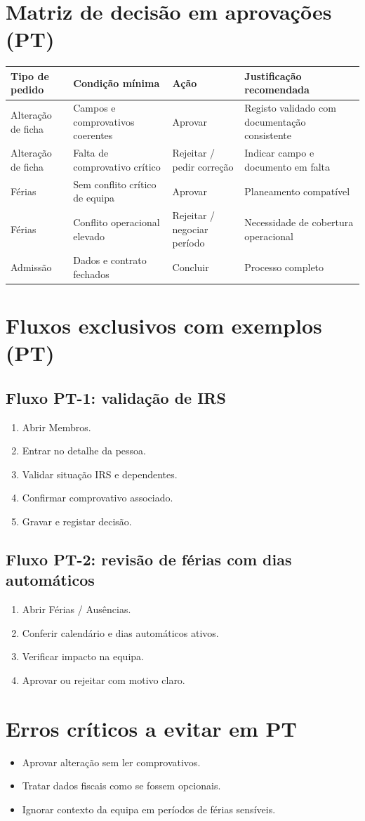 \section{Matriz de decisão em aprovações (PT)}
\begin{longtable}{|p{}|p{}|p{}|p{}|}
\hline
\textbf{Tipo de pedido} & \textbf{Condição mínima} & \textbf{Ação} & \textbf{Justificação recomendada} \\
\hline
Alteração de ficha & Campos e comprovativos coerentes & Aprovar & Registo validado com documentação consistente \\
\hline
Alteração de ficha & Falta de comprovativo crítico & Rejeitar / pedir correção & Indicar campo e documento em falta \\
\hline
Férias & Sem conflito crítico de equipa & Aprovar & Planeamento compatível \\
\hline
Férias & Conflito operacional elevado & Rejeitar / negociar período & Necessidade de cobertura operacional \\
\hline
Admissão & Dados e contrato fechados & Concluir & Processo completo \\
\hline
\end{longtable}

\section{Fluxos exclusivos com exemplos (PT)}
\subsection{Fluxo PT-1: validação de IRS}
\begin{enumerate}
  \item Abrir Membros.
  \item Entrar no detalhe da pessoa.
  \item Validar situação IRS e dependentes.
  \item Confirmar comprovativo associado.
  \item Gravar e registar decisão.
\end{enumerate}

\subsection{Fluxo PT-2: revisão de férias com dias automáticos}
\begin{enumerate}
  \item Abrir Férias / Ausências.
  \item Conferir calendário e dias automáticos ativos.
  \item Verificar impacto na equipa.
  \item Aprovar ou rejeitar com motivo claro.
\end{enumerate}

\section{Erros críticos a evitar em PT}
\begin{itemize}
  \item Aprovar alteração sem ler comprovativos.
  \item Tratar dados fiscais como se fossem opcionais.
  \item Ignorar contexto da equipa em períodos de férias sensíveis.
\end{itemize}
